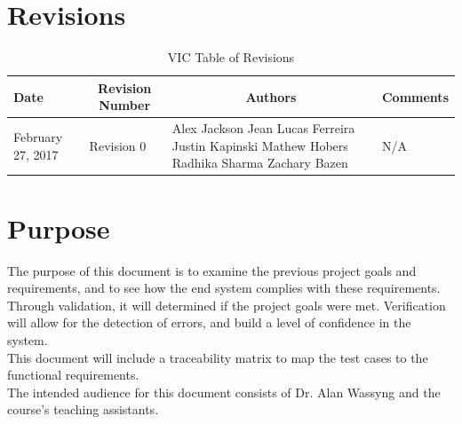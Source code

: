 \documentclass [10pt]{article}
\begin{document}
\section{Revisions}
\begin{longtable}{| p{ } | p{ } | p{ } | p{ } |} \caption{VIC Table of Revisions}  \\

\hline 
\centering \textbf{Date} & 
\multicolumn{1}{c}{\textbf {Revision Number}} &
\multicolumn{1}{|c}{\textbf {Authors}} & 
\multicolumn{1}{|c|}{\textbf {Comments}} \\ \hline

\multirow{4}{*}{\centering February 27, 2017}  & 
\multirow{4}{*}{Revision 0}& 
{Alex Jackson \newline
Jean Lucas Ferreira \newline
Justin Kapinski\newline
Mathew Hobers\newline
Radhika Sharma\newline
Zachary Bazen}
&
 \multirow{4}{*}{N/A} \\ 
\hline 


\end{longtable}
\pagebreak






\section {Purpose}
The purpose of this document is to examine the previous project goals and requirements, and to see how the end system complies with these requirements.  Through validation, it will determined if the project goals were met. Verification will allow for the detection of errors, and build a level of confidence in the system.\\

This document will include a traceability matrix to map the test cases to the functional requirements.   \\


The intended audience for this document consists of Dr. Alan Wassyng and the course's teaching assistants.
\end{document}
